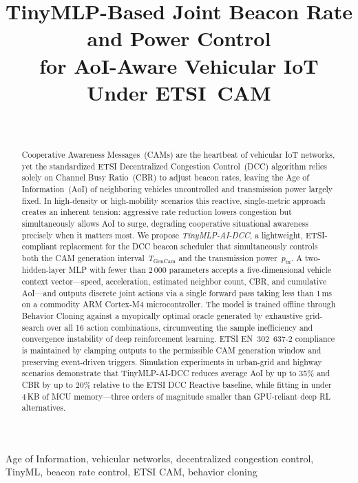 \documentclass[journal]{IEEEtran}
\title{TinyMLP-Based Joint Beacon Rate and Power Control\\
       for AoI-Aware Vehicular IoT Under ETSI~CAM}
\author{%
  \IEEEauthorblockN{TBD\textsuperscript{1}, TBD\textsuperscript{2}, TBD\textsuperscript{3}}\\
  \IEEEauthorblockA{\textsuperscript{1,2,3}Department of TBD, Institution TBD, Country TBD\\
  Email: tbd@tbd.edu}
}
\begin{document}

\maketitle

\begin{abstract}
Cooperative Awareness Messages~(CAMs) are the heartbeat of vehicular
IoT networks, yet the standardized ETSI Decentralized Congestion
Control~(DCC) algorithm relies solely on Channel Busy Ratio~(CBR) to
adjust beacon rates, leaving the Age of Information~(AoI) of
neighboring vehicles uncontrolled and transmission power largely
fixed.  In high-density or high-mobility scenarios this reactive,
single-metric approach creates an inherent tension: aggressive rate
reduction lowers congestion but simultaneously allows AoI to surge,
degrading cooperative situational awareness precisely when it matters
most.  We propose \emph{TinyMLP-AI-DCC}, a lightweight, ETSI-compliant
replacement for the DCC beacon scheduler that simultaneously controls
both the CAM generation interval~$T_{\text{GenCam}}$ and the
transmission power~$p_{\text{tx}}$.  A two-hidden-layer MLP with fewer
than 2\,000 parameters accepts a five-dimensional vehicle context
vector---speed, acceleration, estimated neighbor count, CBR, and
cumulative AoI---and outputs discrete joint actions via a single
forward pass taking less than 1\,ms on a commodity ARM Cortex-M4
microcontroller.  The model is trained offline through Behavior Cloning
against a myopically optimal oracle generated by exhaustive grid-search
over all 16 action combinations, circumventing the sample inefficiency
and convergence instability of deep reinforcement learning.  ETSI
EN~302~637-2 compliance is maintained by clamping outputs to the
permissible CAM generation window and preserving event-driven triggers.
Simulation experiments in urban-grid and highway scenarios demonstrate
that TinyMLP-AI-DCC reduces average AoI by up to 35\% and CBR by
up to 20\% relative to the ETSI DCC Reactive baseline, while
fitting in under 4\,KB of MCU memory---three orders of magnitude
smaller than GPU-reliant deep RL alternatives.
\end{abstract}

\begin{IEEEkeywords}
Age of Information, vehicular networks, decentralized congestion
control, TinyML, beacon rate control, ETSI CAM, behavior cloning
\end{IEEEkeywords}
\end{document}
